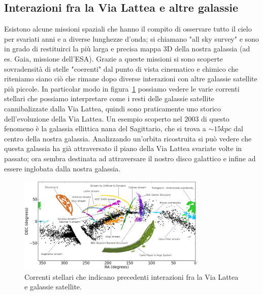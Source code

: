\subsection{Interazioni fra la Via Lattea e altre galassie}
Esistono alcune missioni spaziali che hanno il compito di osservare tutto il cielo per svariati anni e a diverse lunghezze d’onda; si chiamano "all sky survey" e sono in grado di restituirci la più larga e precisa mappa 3D della nostra galassia (ad es. Gaia, missione dell'ESA). Grazie a queste missioni si sono scoperte sovradensità di stelle "coerenti" dal punto di vista cinematico e chimico che riteniamo siano ciò che rimane dopo diverse interazioni con altre galassie satellite più piccole. In particolar modo in figura~\ref{fig:interazioni-via-lattea} possiamo vedere le varie correnti stellari che possiamo interpretare come i resti delle galassie satellite cannibalizzate dalla Via Lattea, quindi sono praticamente uno storico dell'evoluzione della Via Lattea. Un esempio scoperto nel 2003 di questo fenomeno è la galassia ellittica nana del Sagittario, che si trova a $\sim 15 \si{kpc}$ dal centro della nostra galassia. Analizzando un'orbita ricostruita si può vedere che questa galassia ha già attraversato il piano della Via Lattea svariate volte in passato; ora sembra destinata ad attraversare il nostro disco galattico  e infine ad essere inglobata dalla nostra galassia.

\begin{figure}
    \centering
    \includegraphics[width = 0.8\textwidth]{immagini/interazioni-via-lattea.png}
    \caption{Correnti stellari che indicano precedenti interazioni fra la Via Lattea e galassie satellite.}
    \label{fig:interazioni-via-lattea}
\end{figure}